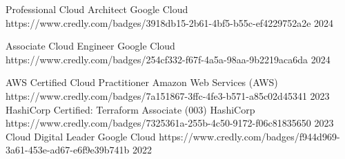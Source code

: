 

\begin{cvhonors}

  \cvhonor
    {Professional Cloud Architect} %
    {Google Cloud} %
    {https://www.credly.com/badges/3918db15-2b61-4bf5-b55c-ef4229752a2e} %
    {2024} %

  \cvhonor
    {Associate Cloud Engineer} %
    {Google Cloud} %
    {https://www.credly.com/badges/254cf332-f67f-4a5a-98aa-9b2219aca6da} %
    {2024} %

  \cvhonor
    {AWS Certified Cloud Practitioner} %
    {Amazon Web Services (AWS)} %
    {https://www.credly.com/badges/7a151867-3ffc-4fe3-b571-a85c02d45341} %
    {2023} %
  \cvhonor
    {HashiCorp Certified: Terraform Associate (003)} %
    {HashiCorp} %
    {https://www.credly.com/badges/7325361a-255b-4c50-9172-f06c81835650} %
    {2023} %
  \cvhonor
    {Cloud Digital Leader} %
    {Google Cloud} %
    {https://www.credly.com/badges/f944d969-3a61-453e-ad67-e6f9e39b741b} %
    {2022} %
\end{cvhonors}

